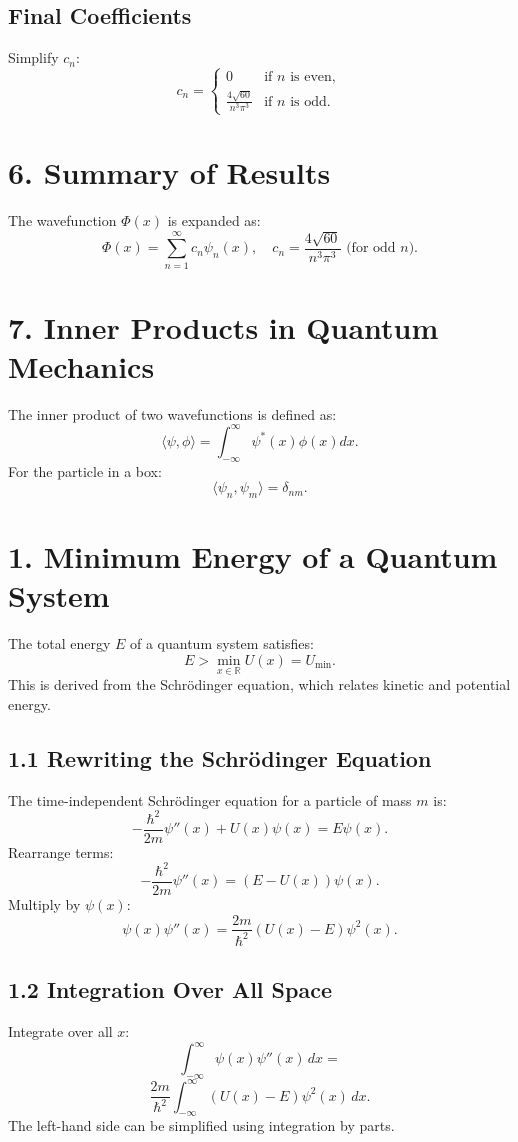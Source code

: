 \documentclass[a4paper,12pt]{article}
\begin{document}
\begin{multicols}{2}
\subsection*{Final Coefficients}
Simplify $c_n$:
\[
c_n = \begin{cases}
0 & \text{if } n \text{ is even}, \\
\frac{4\sqrt{60}}{n^3\pi^3} & \text{if } n \text{ is odd}.
\end{cases}
\]

\section*{6. Summary of Results}
The wavefunction $\Phi(x)$ is expanded as:
\[
\Phi(x) = \sum_{n=1}^\infty c_n \psi_n(x), \quad c_n = \frac{4\sqrt{60}}{n^3\pi^3} \text{ (for odd } n).
\]

\section*{7. Inner Products in Quantum Mechanics}
The inner product of two wavefunctions is defined as:
\[
\langle \psi, \phi \rangle = \int_{-\infty}^\infty \psi^*(x) \phi(x) dx.
\]
For the particle in a box:
\[
\langle \psi_n, \psi_m \rangle = \delta_{nm}.
\]
\section*{1. Minimum Energy of a Quantum System}
The total energy $E$ of a quantum system satisfies:
\[
E > \min_{x \in \mathbb{R}} U(x) = U_\text{min}.
\]
This is derived from the Schrödinger equation, which relates kinetic and potential energy.

\subsection*{1.1 Rewriting the Schrödinger Equation}
The time-independent Schrödinger equation for a particle of mass $m$ is:
\[
-\frac{\hbar^2}{2m} \psi''(x) + U(x)\psi(x) = E\psi(x).
\]
Rearrange terms:
\[
-\frac{\hbar^2}{2m} \psi''(x) = (E - U(x))\psi(x).
\]
Multiply by $\psi(x)$:
\[
\psi(x)\psi''(x) = \frac{2m}{\hbar^2} (U(x) - E) \psi^2(x).
\]

\subsection*{1.2 Integration Over All Space}
Integrate over all $x$:
\[
\int_{-\infty}^\infty \psi(x)\psi''(x) \, dx =
\]
\[
\frac{2m}{\hbar^2} \int_{-\infty}^\infty (U(x) - E)\psi^2(x) \, dx.
\]
The left-hand side can be simplified using integration by parts.


\end{multicols}
\end{document}
